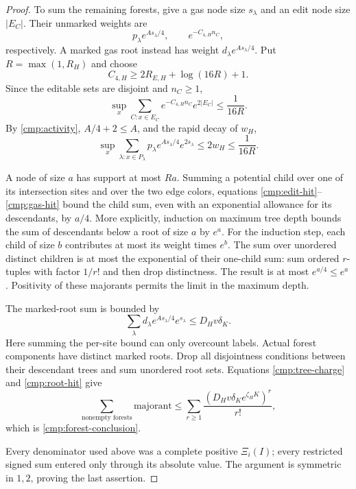 \begin{proof}
To sum the remaining forests, give a gas node size \(s_\lambda\) and
an edit node size \(|E_C|\).  Their unmarked weights are
\[
 p_\lambda e^{As_\lambda/4},\qquad e^{-C_{4,H}n_C},
\]
respectively.  A marked gas root instead has weight
\(d_\lambda e^{As_\lambda/4}\).  Put \(R=\max(1,R_H)\) and choose
\begin{equation}
 C_{4,H}\ge2R_{E,H}+\log(16R)+1 .
 \label{cmp:C4}
\end{equation}
Since the editable sets are disjoint and \(n_C\ge1\),
\begin{equation}
 \sup_x\sum_{C:x\in E_C}
             e^{-C_{4,H}n_C}e^{2|E_C|}
       \le\frac1{16R}.
 \label{cmp:edit-hit}
\end{equation}
By \eqref{cmp:activity}, \(A/4+2\le A\), and the rapid decay of \(w_H\),
\begin{equation}
 \sup_x\sum_{\lambda:x\in P_\lambda}
           p_\lambda e^{As_\lambda/4}e^{2s_\lambda}
       \le2w_H\le\frac1{16R}.
 \label{cmp:gas-hit}
\end{equation}

A node of size \(a\) has support at most \(Ra\).  Summing a potential
child over one of its intersection sites and over the two edge colors,
equations \eqref{cmp:edit-hit}--\eqref{cmp:gas-hit} bound the child sum,
even with an exponential allowance for its descendants, by \(a/4\).
More explicitly, induction on maximum tree depth bounds the sum of
descendants below a root of size \(a\) by \(e^a\).  For the induction
step, each child of size \(b\) contributes at most its weight times
\(e^b\).  The sum over unordered distinct children is at most the
exponential of their one-child sum: sum ordered \(r\)-tuples with
factor \(1/r!\) and then drop distinctness.  The result is at most
\(e^{a/4}\le e^a\).  Positivity of these majorants permits the limit in
the maximum depth.

The marked-root sum is bounded by
\begin{equation}
 \sum_\lambda d_\lambda e^{As_\lambda/4}e^{s_\lambda}
       \le D_Hv\delta_K.
 \label{cmp:root-hit}
\end{equation}
Here summing the per-site bound can only overcount labels.  Actual
forest components have distinct marked roots.  Drop all disjointness
conditions between their descendant trees and sum unordered root sets.
Equations \eqref{cmp:tree-charge} and \eqref{cmp:root-hit} give
\[
 \sum_{\text{nonempty forests}}\text{majorant}
 \le \sum_{r\ge1}
       \frac{(D_Hv\delta_K e^{\zeta_HK})^r}{r!},
\]
which is \eqref{cmp:forest-conclusion}.

Every denominator used above was a complete positive \(\Xi_i(I)\);
every restricted signed sum entered only through its absolute value.
The argument is symmetric in \(1,2\), proving the last assertion.
\end{proof}

